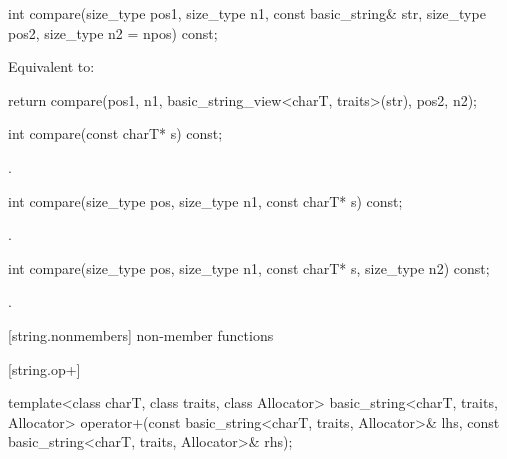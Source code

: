 %
\begin{itemdecl}
int compare(size_type pos1, size_type n1,
            const basic_string& str,
            size_type pos2, size_type n2 = npos) const;
\end{itemdecl}

\begin{itemdescr}
\pnum
\effects Equivalent to:
\begin{codeblock}
return compare(pos1, n1, basic_string_view<charT, traits>(str), pos2, n2);
\end{codeblock}
\end{itemdescr}

%
\begin{itemdecl}
int compare(const charT* s) const;
\end{itemdecl}

\begin{itemdescr}
\pnum
\returns
{}.
\end{itemdescr}

%
\begin{itemdecl}
int compare(size_type pos, size_type n1, const charT* s) const;
\end{itemdecl}

\begin{itemdescr}
\pnum
\returns {}.
\end{itemdescr}

%
\begin{itemdecl}
int compare(size_type pos, size_type n1, const charT* s, size_type n2) const;
\end{itemdecl}

\begin{itemdescr}
\pnum
\returns {}.
\end{itemdescr}

[string.nonmembers]{ non-member functions}


[string.op+]{}

%
\begin{itemdecl}
template<class charT, class traits, class Allocator>
  basic_string<charT, traits, Allocator>
    operator+(const basic_string<charT, traits, Allocator>& lhs,
              const basic_string<charT, traits, Allocator>& rhs);
\end{itemdecl}

